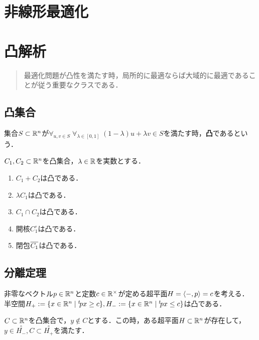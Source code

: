 \documentclass[uplatex,dvipdfmx]{jsreport}
\begin{document}
\chapter{非線形最適化}

\chapter{凸解析}

\begin{quotation}
    最適化問題が凸性を満たす時，局所的に最適ならば大域的に最適であることが従う重要なクラスである．
\end{quotation}

\section{凸集合}

\begin{definition}
    集合$S\subset\mathbb{R}^n$が$\forall_{u,v\in S}\;\forall_{\lambda\in[0,1]}\;(1-\lambda)u+\lambda v\in S$を満たす時，\textbf{凸}であるという．
\end{definition}

\begin{lemma}
    $C_1,C_2\subset\mathbb{R}^n$を凸集合，$\lambda\in\mathbb{R}$を実数とする．
    \begin{enumerate}
        \item $C_1+C_2$は凸である．
        \item $\lambda C_1$は凸である．
        \item $C_1\cap C_2$は凸である．
        \item 開核$C_1^\circ$は凸である．
        \item 閉包$\overline{C_1}$は凸である．
    \end{enumerate}
\end{lemma}

\section{分離定理}

\begin{lemma}[超平面]
    非零なベクトル$p\in\mathbb{R}^n$と定数$c\in\mathbb{R}^\times$が定める超平面$H=\langle-,p\rangle=c$を考える．
    半空間$H_+:=\{x\in\mathbb{R}^n\mid {}^t\!px\ge c\},H_-:=\{x\in\mathbb{R}^n\mid {}^t\!px\le c\}$は凸である．
\end{lemma}

\begin{proposition}\label{prop-separation-1}
    $C\subset\mathbb{R}^n$を凸集合で，$y\notin C$とする．この時，ある超平面$H\subset\mathbb{R}^n$が存在して，$y\in\overset{\circ}{H_-},C\subset\overset{\circ}{H_+}$を満たす．
\end{proposition}
\end{document}
